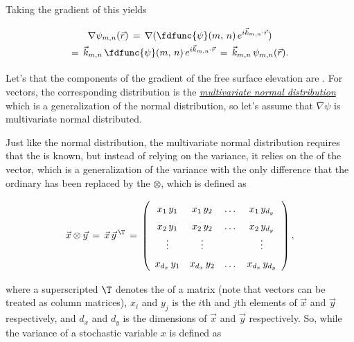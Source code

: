 {Taking the gradient of this yields

\begin{equation} \label{eq:grad_eta_one_dirac}
\renewcommand*{\arraystretch}{1.5}
\begin{array}{c}
\displaystyle \nabla\psi_{m,n}(\vec{r}) \,=\, \nabla(\fdfunc{\psi}(m,\,n)\,e^{i\vec{k}_{m,n}\cdot\vec{r}}) \\
\displaystyle =\, \vec{k}_{m,n}\,\fdfunc{\psi}(m,\,n)\,e^{i\vec{k}_{m,n}\cdot\vec{r}} \,=\, \vec{k}_{m,n}\,\psi_{m,n}(\vec{r}).
\end{array}
\end{equation}

Let's \assume that the components of the gradient of the free surface elevation are . For vectors, the corresponding distribution is the \textit{\href{http://en.wikipedia.org/wiki/Multivariate\_normal\_distribution\#Non-degenerate\_case}{multivariate normal distribution}} which is a generalization of the normal distribution, so let's assume that $\nabla\psi$ is multivariate normal distributed.

Just like the normal distribution, the multivariate normal distribution requires that the \mean is known, but instead of relying on the variance, it relies on the  of the vector, which is a generalization of the variance with the only difference that the ordinary  has been replaced by the  $\otimes$, which is defined as

\begin{equation} \label{eq:outer_product_definition}
\vec{x}\otimes\vec{y} \,=\, \vec{x}\,\vec{y}^{\,\T} \,=\,
\left(\begin{array}{cccc}
x_1    \,y_1 & x_1    \,y_2 & \dots & x_1    \,y_{d_y} \\
x_2    \,y_1 & x_2    \,y_2 & \dots & x_2    \,y_{d_y} \\
\vdots       & \vdots       &       & \vdots           \\
x_{d_x}\,y_1 & x_{d_x}\,y_2 & \dots & x_{d_x}\,y_{d_y}
\end{array}\right),
\end{equation}

where a superscripted $\T$ denotes the \transpose of a matrix (note that vectors can be treated as column matrices), $x_i$ and $y_j$ is the $i$th and $j$th elements of $\vec{x}$ and $\vec{y}$ respectively, and $d_x$ and $d_y$ is the dimensions of $\vec{x}$ and $\vec{y}$ respectively. So, while the variance of a stochastic variable $x$ is defined as

}
